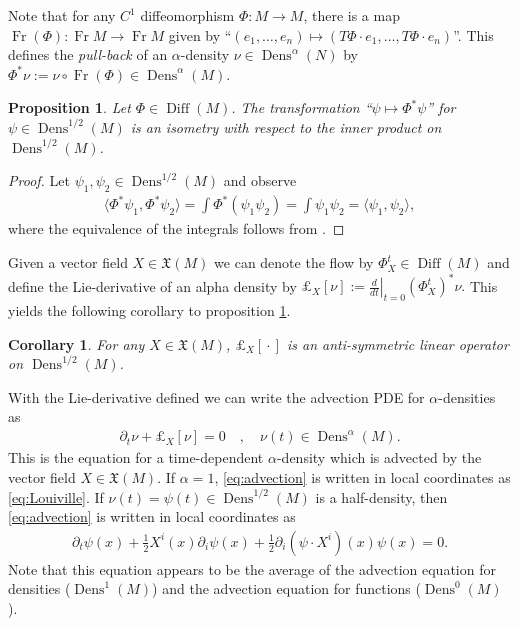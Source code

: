 \documentclass[letterpaper, 12 pt]{amsart}
\newtheorem{prop}[thm]{Proposition}
\newtheorem{cor}[thm]{Corollary}
\DeclareMathOperator{\Diff}{Diff}
\DeclareMathOperator{\Fr}{Fr}
\DeclareMathOperator{\Dens}{Dens}
\begin{document}
  Note that for any $C^1$ diffeomorphism $\Phi:M \to M$,
  there is a map $\Fr(\Phi) : \Fr M \to \Fr M$
  given by 
  ``$(e_1,\dots,e_n) \mapsto (T\Phi \cdot e_1, \dots, T\Phi \cdot e_n)$''.
  This defines the \emph{pull-back} of an $\alpha$-density
  $\nu \in \Dens^\alpha(N)$
  by $\Phi^* \nu := \nu \circ \Fr(\Phi) \in \Dens^\alpha(M)$.
  \begin{prop} \label{prop:isom}
    Let $\Phi \in \Diff(M)$.
    The transformation ``$\psi \mapsto \Phi^* \psi$'' for
    $\psi \in \Dens^{1/2}(M)$ is an isometry with respect
    to the inner product on $\Dens^{1/2}(M)$.
  \end{prop}
  \begin{proof}
    Let $\psi_1,\psi_2 \in \Dens^{1/2}(M)$ and observe
    \begin{align*}
      \langle \Phi^* \psi_1, \Phi^* \psi_2 \rangle
      = \int \Phi^*( \psi_1 \psi_2)
      = \int \psi_1 \psi_2
      = \langle \psi_1, \psi_2 \rangle,
    \end{align*}
    where the equivalence of the integrals follows
    from \cite[Proposition 14.32(c)]{Lee2006}.
  \end{proof}
  
  Given a vector field $X \in \mathfrak{X}(M)$
  we can denote the flow by $\Phi^t_X \in \Diff(M)$
  and define the Lie-derivative of an alpha density by
  $
    \pounds_X[ \nu ] := \left. \frac{d}{dt} \right|_{t=0} (\Phi_X^t)^* \nu.
  $
  This yields the following corollary to proposition \ref{prop:isom}.
  \begin{cor}
    For any $X \in \mathfrak{X}(M)$, $\pounds_X[ {}\cdot{} ]$
    is an anti-symmetric linear operator on $\Dens^{1/2}(M)$.
  \end{cor}
  With the Lie-derivative defined we can write the advection
  PDE for $\alpha$-densities as
  \begin{align}
    \partial_t \nu + \pounds_X[\nu] = 0  \quad,\quad \nu(t) \in \Dens^\alpha(M) \label{eq:advection}.
  \end{align}
  This is the equation for a time-dependent $\alpha$-density which is advected by the vector field 
  $X \in \mathfrak{X}(M)$.
  If $\alpha = 1$, \eqref{eq:advection} is written in local coordinates
  as \eqref{eq:Louiville}.
  If $\nu(t) = \psi(t) \in \Dens^{1/2}(M)$ is a half-density, then
  \eqref{eq:advection} is written in local coordinates as
  \begin{align}
    \partial_t \psi(x) 
    + \frac{1}{2} X^i(x) \partial_i \psi(x) 
    + \frac{1}{2} \partial_i (\psi \cdot X^i)(x) \psi(x) = 0. \label{eq:local_half_density_advection}
  \end{align}
  Note that this equation appears to be the average of the advection equation for densities ($\Dens^1(M)$) and the advection equation for functions ($\Dens^0(M)$).
\end{document}
